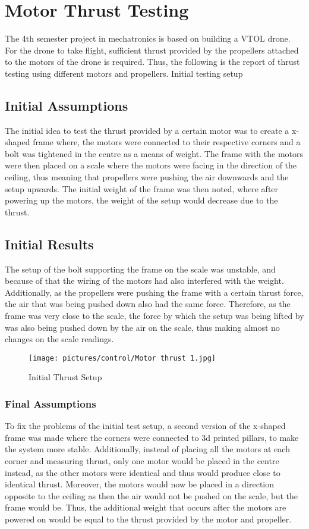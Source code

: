 \section{Motor Thrust Testing}\label{appendix_thrust}
The 4th semester project in mechatronics is based on building a VTOL drone. For the drone to take flight, 
sufficient thrust provided by the propellers attached to the motors of the drone is required. Thus,
the following is the report of thrust testing using different motors and propellers.
Initial testing setup

\subsection{Initial Assumptions}
The initial idea to test the thrust provided by a certain motor was to create a x-shaped frame where, 
the motors were connected to their respective corners and a bolt was tightened in the centre as a means of weight. 
The frame with the motors were then placed on a scale where the motors were facing in the direction of the ceiling, 
thus meaning that propellers were pushing the air downwards and the setup upwards. The initial weight of the frame was then noted, 
where after powering up the motors, the weight of the setup would decrease due to the thrust. 

\subsection{Initial Results}
The setup of the bolt supporting the frame on the scale was unstable, and because of that the wiring of the motors had also
interfered with the weight. Additionally, as the propellers were pushing the frame with a certain thrust force, 
the air that was being pushed down also had the same force. Therefore, as the frame was very close to the scale, 
the force by which the setup was being lifted by was also being pushed down by the air on the scale, thus making almost no 
changes on the scale readings. 

\begin{figure}
    \texttt{[image: pictures/control/Motor thrust 1.jpg]}
    \caption{Initial Thrust Setup}
    \label{fig:Initial Thrust Setup}

\end{figure}

\subsubsection{Final Assumptions}
To fix the problems of the initial test setup, a second version of the x-shaped frame was made where the corners were connected to 3d printed pillars, 
to make the system more stable. Additionally, instead of placing all the motors at each corner and measuring thrust, only one motor would be placed in the centre instead, 
as the other motors were identical and thus would produce close to identical thrust. Moreover, the motors would now be placed in a direction opposite to the ceiling as then the air would not be pushed on the scale, 
but the frame would be. Thus, the additional weight that occurs after the motors are powered on would be equal to the thrust provided by the motor and propeller.

